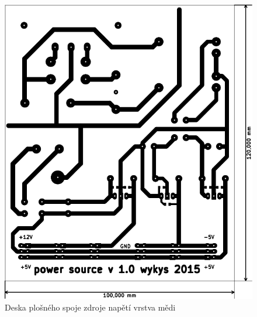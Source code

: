 \begin{figure}[H]
	\centering
	\includegraphics[width=170mm]{img/zdroj/cu_b.pdf}
	\caption{Deska plošného spoje zdroje napětí vrstva mědi}    		
\end{figure}

